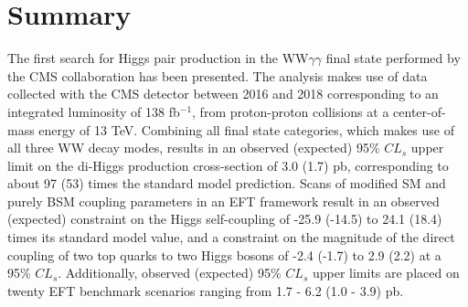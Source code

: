 \section{Summary} \label{section:Summary}

The first search for Higgs pair production in the WW$\gamma\gamma$ final state performed by the CMS collaboration has been presented. The analysis makes use of 
data collected with the CMS detector between 2016 and 2018 corresponding to an integrated luminosity of 138 \unit{fb}$^{-1}$, from proton-proton collisions at a center-of-mass energy of 13 TeV.
Combining all final state categories, which makes use of all three WW decay modes, results in an observed (expected) 95\% $CL_{s}$ upper limit on the di-Higgs production cross-section of 
3.0 (1.7) pb, corresponding to about 97 (53) times the standard model prediction. Scans of modified SM and purely BSM coupling parameters in an EFT framework result in an
observed (expected) constraint on the Higgs self-coupling of -25.9 (-14.5) to 24.1 (18.4) times its standard model value, and a constraint on the magnitude of the 
direct coupling of two top quarks to two Higgs bosons of -2.4 (-1.7) to 2.9 (2.2) at a 95\% $CL_{s}$. Additionally, observed (expected) 95\% $CL_{s}$ upper limits are 
placed on twenty EFT benchmark scenarios ranging from 1.7 - 6.2 (1.0 - 3.9) pb.

